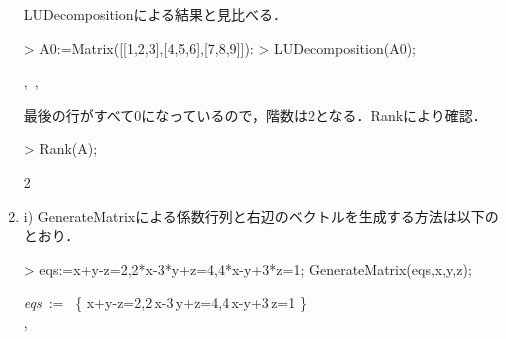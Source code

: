 \begin{enumerate}
\begin{MapleOutput}
\end{MapleOutput}
LUDecompositionによる結果と見比べる．
\begin{MapleInput}
> A0:=Matrix([[1,2,3],[4,5,6],[7,8,9]]):
> LUDecomposition(A0);
\end{MapleInput}
\begin{MapleOutput}
 ,\,  ,\,  
\end{MapleOutput}
最後の行がすべて0になっているので，階数は2となる．Rankにより確認．
\begin{MapleInput}
> Rank(A);
\end{MapleInput}
\begin{MapleOutput}
2
\end{MapleOutput}

\item
i) GenerateMatrixによる係数行列と右辺のベクトルを生成する方法は以下のとおり．
\begin{MapleInput}
> eqs:={x+y-z=2,2*x-3*y+z=4,4*x-y+3*z=1}; GenerateMatrix(eqs,{x,y,z});
\end{MapleInput}
\begin{MapleOutputGather}
{\it eqs}\, := \, \left\{ x+y-z=2,2\,x-3\,y+z=4,4\,x-y+3\,z=1 \right\} \notag \\
 ,\, \left[ \begin {array}{c} 2\\  4\\  1\end {array} \right] \notag
\end{MapleOutputGather}


\end{enumerate}
